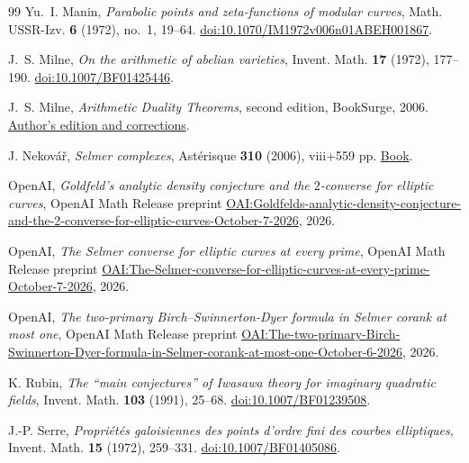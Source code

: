 \begin{thebibliography}{99}
Yu.~I. Manin,
\emph{Parabolic points and zeta-functions of modular curves},
Math. USSR-Izv. \textbf{6} (1972), no.~1, 19--64.
\href{https://doi.org/10.1070/IM1972v006n01ABEH001867}{doi:10.1070/IM1972v006n01ABEH001867}.

J.~S. Milne,
\emph{On the arithmetic of abelian varieties},
Invent. Math. \textbf{17} (1972), 177--190.
\href{https://doi.org/10.1007/BF01425446}{doi:10.1007/BF01425446}.

J.~S. Milne,
\emph{Arithmetic Duality Theorems}, second edition,
BookSurge, 2006.
\href{https://www.jmilne.org/math/Books/adt.html}{Author's edition and corrections}.

J. Nekov\'a\v{r},
\emph{Selmer complexes},
Ast\'erisque \textbf{310} (2006), viii+559 pp.
\href{https://www.numdam.org/item/AST_2006__310__R1_0/}{Book}.

OpenAI,
\emph{Goldfeld's analytic density conjecture and the $2$-converse for elliptic curves},
OpenAI Math Release preprint
\href{https://github.com/openai/math/blob/main/preprints/Goldfelds-analytic-density-conjecture-and-the-2-converse-for-elliptic-curves-October-7-2026/paper.pdf}{OAI:Goldfelds-analytic-density-conjecture-and-the-2-converse-for-elliptic-curves-October-7-2026},
2026.

OpenAI,
\emph{The Selmer converse for elliptic curves at every prime},
OpenAI Math Release preprint
\href{https://github.com/openai/math/blob/main/preprints/The-Selmer-converse-for-elliptic-curves-at-every-prime-October-7-2026/main.pdf}{OAI:The-Selmer-converse-for-elliptic-curves-at-every-prime-October-7-2026},
2026.

OpenAI,
\emph{The two-primary Birch--Swinnerton-Dyer formula in Selmer corank at most one},
OpenAI Math Release preprint
\href{https://github.com/openai/math/blob/main/preprints/The-two-primary-Birch-Swinnerton-Dyer-formula-in-Selmer-corank-at-most-one-October-6-2026/paper.pdf}{OAI:The-two-primary-Birch-Swinnerton-Dyer-formula-in-Selmer-corank-at-most-one-October-6-2026},
2026.

K. Rubin,
\emph{The ``main conjectures'' of Iwasawa theory
for imaginary quadratic fields},
Invent. Math. \textbf{103} (1991), 25--68.
\href{https://doi.org/10.1007/BF01239508}{doi:10.1007/BF01239508}.

J.-P. Serre,
\emph{Propri\'et\'es galoisiennes des points d'ordre fini
des courbes elliptiques},
Invent. Math. \textbf{15} (1972), 259--331.
\href{https://doi.org/10.1007/BF01405086}{doi:10.1007/BF01405086}.


\end{thebibliography}
